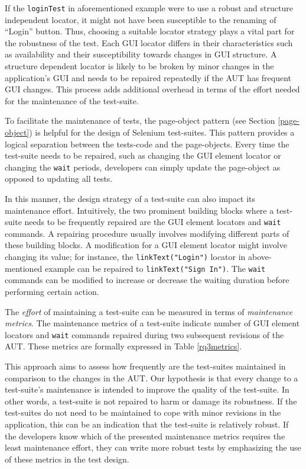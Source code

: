If the \texttt{loginTest} in aforementioned example were to use a robust and structure independent locator, it might not have been susceptible to the renaming of ``Login'' button. Thus, choosing a suitable locator strategy plays a vital part for the robustness of the test. Each GUI locator differs in their characteristics such as availability and their susceptibility towards changes in GUI structure. A structure dependent locator is likely to be broken by minor changes in the application's GUI and needs to be repaired repeatedly if the AUT has frequent GUI changes. This process adds additional overhead in terms of the effort needed for the maintenance of the test-suite.  

To facilitate the maintenance of tests, the page-object pattern (see Section \ref{page-object}) is helpful for the design of Selenium test-suites. This pattern provides a logical separation between the tests-code and the page-objects. Every time the test-suite needs to be repaired, such as changing the GUI element locator or changing the \texttt{wait} periods, developers can simply update the page-object as opposed to updating all tests. 

In this manner, the design strategy of a test-suite can also impact its maintenance effort. Intuitively, the two prominent building blocks where a test-suite needs to be frequently repaired are the GUI element locators and \texttt{wait} commands. A repairing procedure usually involves modifying different parts of these building blocks. A modification for a GUI element locator might involve changing its value; for instance, the \texttt{linkText("Login")} locator in above-mentioned example can be repaired to \texttt{linkText("Sign In")}. The \texttt{wait} commands can be modified to increase or decrease the waiting duration before performing certain action.

The \textit{effort} of maintaining a test-suite can be measured in terms of \textit{maintenance metrics}. The maintenance metrics of a test-suite indicate number of  GUI element locators and \texttt{wait} commands repaired during two subsequent revisions of the AUT. These metrics are formally expressed in Table \ref{rq3metrics}. 

This approach aims to assess how frequently are the test-suites maintained in comparison to the changes in the AUT. Our hypothesis is that every change to a test-suite's maintenance is intended to improve the quality of the test-suite. In other words, a test-suite is not repaired to harm or damage its robustness. If the test-suites do not need to be maintained to cope with minor revisions in the application, this can be an indication that the test-suite is relatively robust. If the developers know which of the presented maintenance metrics requires the least maintenance effort, they can write more robust tests by emphasizing the use of these metrics in the test design. 

